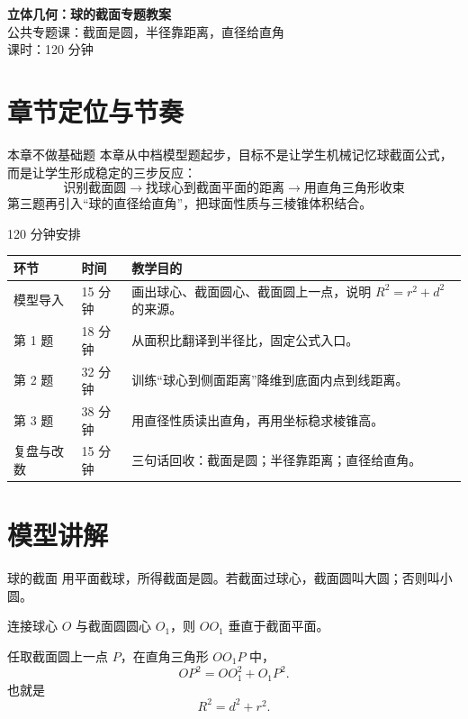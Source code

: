 \documentclass[11pt,a4paper]{ctexart}
\begin{document}
\begin{center}
  {\Large\bfseries 立体几何：球的截面专题教案}\\[0.3em]
  {\large 公共专题课：截面是圆，半径靠距离，直径给直角}\\[0.3em]
  {\small 课时：120 分钟}
\end{center}

\section{章节定位与节奏}

\begin{teachbox}{本章不做基础题}
本章从中档模型题起步，目标不是让学生机械记忆球截面公式，而是让学生形成稳定的三步反应：
\[
  \boxed{
    \text{识别截面圆}
    \rightarrow
    \text{找球心到截面平面的距离}
    \rightarrow
    \text{用直角三角形收束}
  }
\]
第三题再引入“球的直径给直角”，把球面性质与三棱锥体积结合。
\end{teachbox}

\begin{teachbox}{120 分钟安排}
\renewcommand{\arraystretch}{1.35}
\begin{tabularx}{\textwidth}{p{3.2cm}p{2.2cm}X}
\toprule
环节 & 时间 & 教学目的 \\
\midrule
模型导入 & 15 分钟 & 画出球心、截面圆心、截面圆上一点，说明 $R^2=r^2+d^2$ 的来源。 \\
第 1 题 & 18 分钟 & 从面积比翻译到半径比，固定公式入口。 \\
第 2 题 & 32 分钟 & 训练“球心到侧面距离”降维到底面内点到线距离。 \\
第 3 题 & 38 分钟 & 用直径性质读出直角，再用坐标稳求棱锥高。 \\
复盘与改数 & 15 分钟 & 三句话回收：截面是圆；半径靠距离；直径给直角。 \\
\bottomrule
\end{tabularx}
\end{teachbox}

\section{模型讲解}

\begin{teachbox}{球的截面}
用平面截球，所得截面是圆。若截面过球心，截面圆叫大圆；否则叫小圆。

连接球心 $O$ 与截面圆圆心 $O_1$，则 $OO_1$ 垂直于截面平面。

任取截面圆上一点 $P$，在直角三角形 $OO_1P$ 中，
\[
  OP^2=OO_1^2+O_1P^2.
\]
也就是
\[
  R^2=d^2+r^2.
\]
\begin{center}
  \qSolidSphereSectionRatioFigure[1.1]
\end{center}
\end{teachbox}
\end{document}
